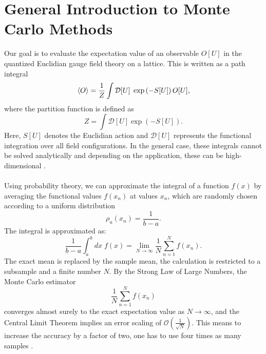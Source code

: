 \section{General Introduction to Monte Carlo Methods}
Our goal is to evaluate the expectation value of an observable $O[U]$ in the quantized Euclidian gauge field theory on a lattice. This is written as a path integral
\begin{equation}
    \braket{O} = \frac{1}{Z} \int \mathcal{D}[U] \; \exp \left( -S[U] \right) O[U], \label{eq: path_integral}
\end{equation}
where the partition function is defined as
\begin{equation}
    Z = \int \mathcal{D}[U] \exp \left( -S[U] \right). \label{eq: partition_function}
\end{equation}
Here, $S[U]$ denotes the Euclidian action and $\mathcal{D}[U]$ represents the functional integration over all field configurations. In the general case, these integrals cannot be solved analytically and depending on the application, these can be high-dimensional \cite{GattingerLang}. \\\\
Using probability theory, we can approximate the integral of a function $f(x)$ by averaging the functional values $f(x_n)$ at values $x_n$, which are randomly chosen according to a uniform distribution 
\begin{equation}
    \rho_u(x_n) = \frac{1}{b-a}. 
\end{equation}
The integral is approximated as: 
\begin{equation}
    \frac{1}{b-a}\int_a^b dx \; f(x) = \lim_{N \rightarrow \infty} \frac{1}{N}\sum_{n=1}^N f(x_n). 
\end{equation}
The exact mean is replaced by the sample mean, the calculation is restricted to a subsample and a finite number $N$. By the Strong Law of Large Numbers, the Monte Carlo estimator
\[
\frac{1}{N} \sum_{n=1}^{N} f(x_n)
\]
converges almost surely to the exact expectation value as $N \to \infty$, and the Central Limit Theorem implies an error scaling of $\mathcal{O}\!\left( \frac{1}{\sqrt{N}} \right)$. This means to increase the accuracy by a factor of two, one has to use four times as many samples \cite{GattingerLang}. 
